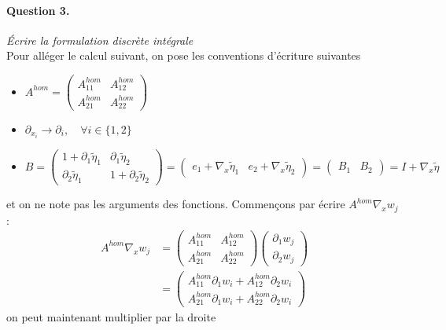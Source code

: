 \documentclass[11pt]{article}
\newcommand{\Ah}{A^{hom}}
\newcommand{\teta}{\tilde{\eta}}
\newcommand{\question}[2]{\paragraph{Question #1.}\textit{#2} \\}
\begin{document}
\question{3}{Écrire la formulation discrète intégrale}
Pour alléger le calcul suivant, on pose les conventions d'écriture suivantes
\begin{itemize}
\item
  $ 
  \Ah = \left(
    \begin{matrix}
      \Ah_{11} & \Ah_{12} \\
      \Ah_{21} & \Ah_{22}
    \end{matrix}
  \right)
  $
\item $ \partial_{x_i} \rightarrow \partial_i, \quad \forall i \in\{1,2\}$  
\item 
  $
  B = \left(
    \begin{matrix}
      1+\partial_1 \teta_1 &   \partial_1 \teta_2 \\
        \partial_2 \teta_1 & 1+\partial_2 \teta_2
    \end{matrix}
  \right)
  = \left(
    \begin{matrix}
      e_1 + \nabla_x \teta_1 & e_2 + \nabla_x \teta_2
    \end{matrix}
  \right)
  = \left(
    \begin{matrix}
      B_1 & B_2
    \end{matrix}
  \right)
  = I + \nabla_x \teta
  $
\end{itemize}
et on ne note pas les arguments des fonctions.
Commençons par écrire $\Ah\nabla_x w_j$ :
\begin{equation}
  \begin{aligned}
    \Ah\nabla_x w_j &=
    \left(
      \begin{matrix}
        \Ah_{11} & \Ah_{12} \\
        \Ah_{21} & \Ah_{22}
      \end{matrix}
    \right)
    \left(
      \begin{matrix}
        \partial_1 w_j \\
        \partial_2 w_j
      \end{matrix}
    \right) \\
    &=
    \left(
      \begin{matrix}
        \Ah_{11} \partial_1 w_i + \Ah_{12} \partial_2 w_i \\
        \Ah_{21} \partial_1 w_i + \Ah_{22} \partial_2 w_i 
      \end{matrix}
    \right)
  \end{aligned}
\end{equation}
on peut maintenant multiplier par la droite
\end{document}
